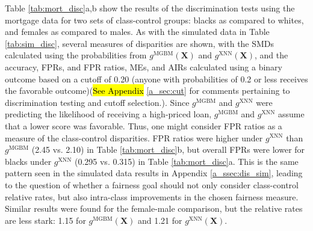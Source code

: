 \documentclass[information,article,accept,moreauthors,pdftex]{Definitions/mdpi}
\begin{document}
{{{Table \ref{tab:mort_disc}{a,b} show the results of the discrimination tests using the mortgage data for two sets of class-control groups: blacks as compared to whites, and females as compared to males. As with the simulated data in Table \ref{tab:sim_disc}, several measures of disparities are shown, with the SMDs calculated using the probabilities from $g^{\text{MGBM}}(\mathbf{X})$ and $g^{\text{XNN}}(\mathbf{X})$, and the accuracy, FPRs, and  FPR ratios, MEs, and AIRs calculated using a binary outcome based on a cutoff of 0.20 (anyone with probabilities of 0.2 or less receives the favorable outcome)({\hl{See Appendix} \ref{a_sec:cut} for comments pertaining to discrimination testing and cutoff selection.).
} Since $g^{\text{MGBM}}$ and $g^{\text{XNN}}$  were predicting the likelihood of receiving a high-priced loan, $g^{\text{MGBM}}$ and $g^{\text{XNN}}$ assume that a lower score was favorable.  Thus, one might consider FPR ratios as a measure of the class-control disparities. FPR ratios were higher under $g^{\text{XNN}}$ than $g^{\text{MGBM}}$ (2.45 vs. 2.10) in Table \ref{tab:mort_disc}{b}, but overall FPRs were lower for blacks under $g^{\text{XNN}}$ (0.295 vs. 0.315) in Table \ref{tab:mort_disc}{a}.  This is the same pattern seen in the simulated data results in Appendix \ref{a_ssec:dis_sim}, leading to the question of whether a fairness goal should not only consider class-control relative rates, but also intra-class improvements in the chosen fairness measure.  Similar results were found for the female-male comparison, but the relative rates are less stark: 1.15 for $g^{\text{MGBM}}(\mathbf{X})$ and 1.21 for $g^{\text{XNN}}(\mathbf{X})$.

}}}
\end{document}
